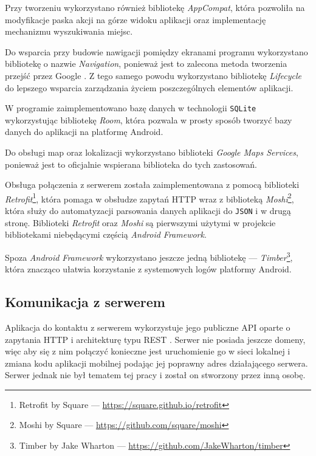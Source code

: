\documentclass[polish,polish,a4paper,12pt]{article}
\begin{document}
	Przy tworzeniu wykorzystano również bibliotekę \textit{AppCompat}, która pozwoliła na modyfikacje paska akcji na górze widoku aplikacji oraz implementację mechanizmu wyszukiwania miejsc.

	Do wsparcia przy budowie nawigacji pomiędzy ekranami programu wykorzystano bibliotekę o nazwie \textit{Navigation}, ponieważ jest to zalecona metoda tworzenia przejść przez Google \cite{androiddevelopment}. Z tego samego powodu wykorzystano bibliotekę \textit{Lifecycle} do lepszego wsparcia zarządzania życiem poszczególnych elementów aplikacji.

	W programie zaimplementowano bazę danych w technologii \texttt{SQLite} wykorzystując bibliotekę \textit{Room}, która pozwala w prosty sposób tworzyć bazy danych do aplikacji na platformę Android.

	Do obsługi map oraz lokalizacji wykorzystano biblioteki \textit{Google Maps Services}, ponieważ jest to oficjalnie wspierana biblioteka do tych zastosowań.

	Obsługa połączenia z serwerem została zaimplementowana z pomocą biblioteki \textit{Retrofit}\footnote{Retrofit by Square — \url{https://square.github.io/retrofit}}, która pomaga w obsłudze zapytań HTTP wraz z biblioteką \textit{Moshi}\footnote{Moshi by Square — \url{https://github.com/square/moshi}}, która służy do automatyzacji parsowania danych aplikacji do \texttt{JSON} i w drugą stronę. Biblioteki \textit{Retrofit} oraz \textit{Moshi} są pierwszymi użytymi w projekcie bibliotekami niebędącymi częścią \textit{Android Framework}.

	Spoza \textit{Android Framework} wykorzystano jeszcze jedną bibliotekę — \textit{Timber}\footnote{Timber by Jake Wharton — \url{https://github.com/JakeWharton/timber}}, która znacząco ułatwia korzystanie z systemowych logów platformy Android.

	\subsection{Komunikacja z serwerem}

	Aplikacja do kontaktu z serwerem wykorzystuje jego publiczne API oparte o zapytania HTTP i architekturę typu REST \cite{restwiki}. Serwer nie posiada jeszcze domeny, więc aby się z nim połączyć konieczne jest uruchomienie go w sieci lokalnej i zmiana kodu aplikacji mobilnej podając jej poprawny adres działającego serwera. Serwer jednak nie był tematem tej pracy i został on stworzony przez inną osobę.
\end{document}
